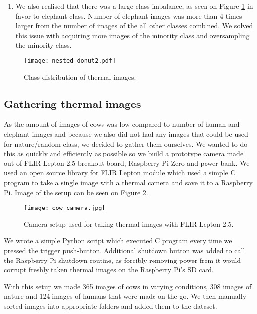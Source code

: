 \begin{enumerate}
    \item We also realised that there was a large class imbalance, as seen on Figure \ref{nested_donut2} in favor to elephant class.
Number of elephant images was more than 4 times larger from the number of images of the all other classes combined.
We solved this issue with acquiring more images of the minority class and oversampling the minority class.
\end{enumerate}

\begin{figure}[ht]
    \centering
    \texttt{[image: nested\_donut2.pdf]} 
    \caption{Class distribution of thermal images.}
    \label{nested_donut2}
\end{figure}

\subsection{ Gathering thermal images}

As the amount of images of cows was low compared to number of human and elephant images and because we also did not had any images that could be used for nature/random class, we decided to gather them ourselves.
We wanted to do this as quickly and efficiently as possible so we build a prototype camera made out of FLIR Lepton 2.5 breakout board, Raspberry Pi Zero and power bank.
We used an open source library \cite{flir_github} for FLIR Lepton module which used a simple C program to take a single image with a thermal camera and save it to a Raspberry Pi.
Image of the setup can be seen on Figure \ref{cow_camera}.

\begin{figure}[ht]
    \centering
    \texttt{[image: cow\_camera.jpg]} 
    \caption{Camera setup used for taking thermal images with FLIR Lepton 2.5.}
    \label{cow_camera}
\end{figure}

We wrote a simple Python script which executed C program every time we pressed the trigger push-button.
Additional shutdown button was added to call the Raspberry Pi shutdown routine, as forcibly removing power from it would corrupt freshly taken thermal images on the Raspberry Pi's SD card.

With this setup we made 365 images of cows in varying conditions, 308 images of nature and 124 images of humans that were made on the go.
We then manually sorted images into appropriate folders and added them to the dataset.


